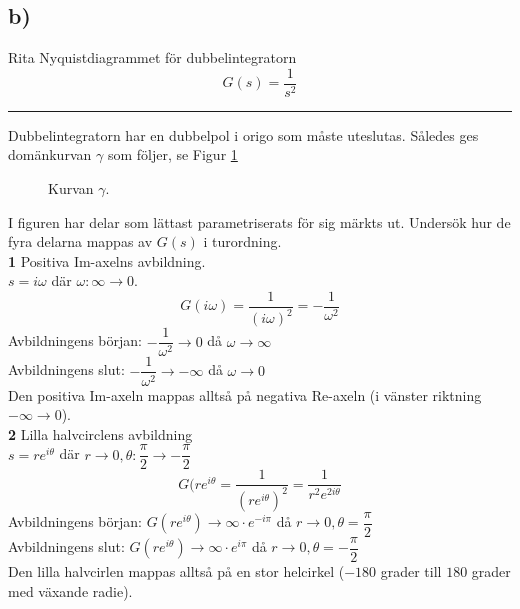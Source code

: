 \documentclass[12pt]{article}
\newcommand{\qline}{\hrule \vspace*{10pt}}
\begin{document}
\subsection*{b)}
Rita Nyquistdiagrammet för dubbelintegratorn
\[G(s) = \frac{1}{s^2}\]
\qline
Dubbelintegratorn har en dubbelpol i origo som måste uteslutas. Således ges domänkurvan $\gamma$ som följer, se Figur \ref{fig:315nyquistorig}
\begin{figure}[h!]
\centering  
{}
\caption{Kurvan $\gamma$.}
  \label{fig:315nyquistorig}
\end{figure}
\FloatBarrier
I figuren har delar som lättast parametriserats för sig märkts ut. Undersök hur de fyra delarna mappas av $G(s)$ i turordning.\\

\textbf{1} Positiva Im-axelns avbildning.\\
$s = i\omega$ där $\omega: \infty \to 0$.
\[G(i\omega) = \frac{1}{(i\omega)^2} = -\frac{1}{\omega^2}\]
Avbildningens början: $-\dfrac{1}{\omega^2} \to 0$ då $\omega \to \infty$ \\
Avbildningens slut: $-\dfrac{1}{\omega^2} \to -\infty$ då $\omega \to 0$ \\
Den positiva Im-axeln mappas alltså på negativa Re-axeln (i vänster riktning $-\infty \to 0$). \\

\textbf{2} Lilla halvcirclens avbildning \\
$s = re^{i\theta}$ där $r \to 0, \theta: \dfrac{\pi}{2} \to -\dfrac{\pi}{2}$
\[G(re^{i\theta} = \frac{1}{(re^{i\theta})^2} = \frac{1}{r^2e^{2i\theta}}\]
Avbildningens början: $G(re^{i\theta}) \to \infty \cdot e^{-i\pi}$ då $r \to 0, \theta = \dfrac{\pi}{2}$ \\
Avbildningens slut: $G(re^{i\theta}) \to \infty \cdot e^{i\pi}$ då $r \to 0, \theta = -\dfrac{\pi}{2}$ \\
Den lilla halvcirlen mappas alltså på en stor helcirkel ($-180$ grader till $180$ grader med växande radie). \\
\end{document}

